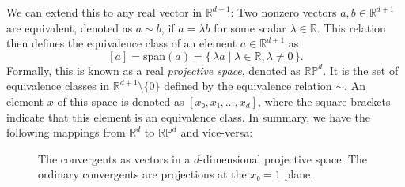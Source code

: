 We can extend this to any real vector in $ℝ^{d+1}$:
Two nonzero vectors $a, b ∈ ℝ^{d+1}$ are equivalent,
denoted as $a \sim b$, if $a = λ b$ for some scalar $λ ∈ ℝ$.
This relation then defines the equivalence class of an element $a ∈ ℝ^{d+1}$ as
\[
  [a] = \mathrm{span}(a) = \{\, λ a \mid λ ∈ ℝ, λ ≠ 0 \,\}.
\]
Formally, this is known as a real \emph{projective space}, denoted as $\mathbb{RP}^d$.
It is the set of equivalence classes in $ℝ^{d+1} \setminus \{0\}$ defined by the
equivalence relation $\sim$.
An element $x$ of this space is denoted as $[x₀, x₁, …, x_d]$,
where the square brackets indicate that this element is an equivalence
class.
In summary, we have the following mappings from $ℝ^d$ to $\mathbb{RP}^d$
and vice-versa:

\begin{center}
\end{center}

\begin{figure}[tbp]
  \centering
  
  \caption{
    The convergents as vectors in a $d$-dimensional projective space.
    The ordinary convergents are projections at the $x₀ = 1$ plane.
  }
  \label{fig:projective-space}
\end{figure}

